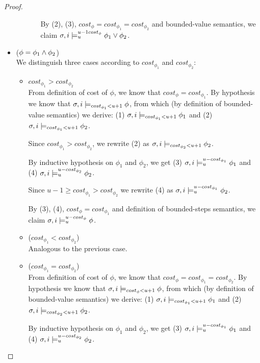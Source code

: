 \begin{theorem}
\begin{lemma}
\begin{proof}
\begin{itemize}
\begin{itemize}
\begin{itemize}
            By (2), (3), $cost_\phi = cost_{\phi_1} = cost_{\phi_2}$ and bounded-value semantics, we claim $\sigma,i \models_{u}^{u-1cost_\phi} \phi_1 \lor \phi_2$.
        \end{itemize}
    \end{itemize}

    \item ($\phi = \phi_1 \land \phi_2$) \\
    We distinguish three cases according to $cost_{\phi_1}$ and $cost_{\phi_2}$:
    \begin{itemize}
        \item $cost_{\phi_1} > cost_{\phi_2}$ \\
        From definition of cost of $\phi$, we know that $cost_\phi = cost_{\phi_1}$.
        By hypothesis we know that $\sigma,i \models_{cost_{\phi_1} < u + 1} \phi$, from which (by definition of bounded-value semantics) we derive: (1) $\sigma,i \models_{cost_{\phi_1} < u + 1} \phi_1$ and (2) $\sigma,i \models_{cost_{\phi_1} < u + 1} \phi_2$.

        Since $cost_{\phi_1} > cost_{\phi_2}$, we rewrite (2) as $\sigma,i \models_{cost_{\phi_2} < u + 1} \phi_2$.

        By inductive hypothesis on $\phi_1$ and $\phi_2$, we get (3) $\sigma,i \models_{u}^{u-cost_{\phi_1}} \phi_1$ and (4) $\sigma,i \models_{u}^{u-cost_{\phi_2}} \phi_2$.

        Since $u-1 \geq cost_{\phi_1} > cost_{\phi_2}$ we rewrite (4) as $\sigma,i \models_{u}^{u-cost_{\phi_1}} \phi_2$.

        By (3), (4), $cost_\phi = cost_{\phi_1}$ and definition of bounded-steps semantics, we claim $\sigma,i \models_{u}^{u-cost_\phi} \phi$.

        \item ($cost_{\phi_1} < cost_{\phi_2}$) \\
        Analogous to the previous case.

        \item ($cost_{\phi_1} = cost_{\phi_2}$) \\
        From definition of cost of $\phi$, we know that $cost_\phi = cost_{\phi_1} = cost_{\phi_2}$.
        By hypothesis we know that $\sigma,i \models_{cost_\phi < u + 1} \phi$, from which (by definition of bounded-value semantics) we derive: (1) $\sigma,i \models_{cost_{\phi_1} < u + 1} \phi_1$ and (2) $\sigma,i \models_{cost_{\phi_2} < u + 1} \phi_2$.

        By inductive hypothesis on $\phi_1$ and $\phi_2$, we get (3) $\sigma,i \models_{u}^{u-cost_{\phi_1}} \phi_1$ and (4) $\sigma,i \models_{u}^{u-cost_{\phi_2}} \phi_2$.


\end{itemize}
\end{itemize}
\end{proof}
\end{lemma}
\end{theorem}
